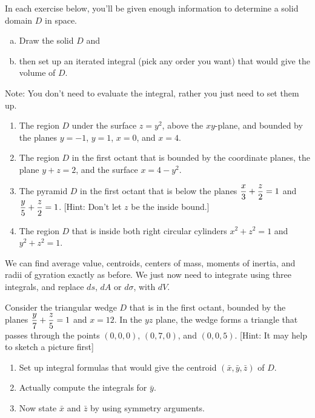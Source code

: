 \begin{problem}
 In each exercise below, you'll be given enough information to determine a solid domain $D$ in space. 
\begin{enumerate}[a)]
	\item Draw the solid $D$ and 
	\item then set up an iterated integral (pick any order you want) that would give the volume of $D$.  
\end{enumerate}
Note: You don't need to evaluate the integral, rather you just need to set them up.
\begin{enumerate}
 \item The region $D$ under the surface $z=y^2$, above the $xy$-plane, and bounded by the planes $y=-1$, $y=1$, $x=0$, and $x=4$.
 \item The region $D$ in the first octant that is bounded by the coordinate planes, the plane $y+z=2$, and the surface $x=4-y^2$.
 \item The pyramid $D$ in the first octant that is below the planes $\displaystyle\frac{x}{3}+\frac{z}{2}=1$ and $\displaystyle\frac{y}{5}+\frac{z}{2}=1$. [Hint: Don't let $z$ be the inside bound.]
 \item The region $D$ that is inside both right circular cylinders $x^2+z^2=1$ and $y^2+z^2=1$.
\end{enumerate}
\end{problem}

We can find average value, centroids, centers of mass, moments of inertia, and radii of gyration exactly as before. We just now need to integrate using three integrals, and replace $ds$, $dA$ or $d\sigma$, with $dV$.  
\begin{problem}
 Consider the triangular wedge $D$ that is in the first octant, bounded by the planes $\displaystyle\frac{y}{7}+\frac{z}{5}=1$ and $x=12$. In the $yz$ plane, the wedge forms a triangle that passes through the points $(0,0,0)$,  $(0,7,0)$, and $(0,0,5)$.  [Hint: It may help to sketch a picture first]
\begin{enumerate}
	\item Set up integral formulas that would give the centroid $(\bar x,\bar y, \bar z)$ of $D$.  
	\item Actually compute the integrals for $\bar y$. 
	\item Now state $\bar x$ and $\bar z$ by using symmetry arguments.
\end{enumerate}
\end{problem}

